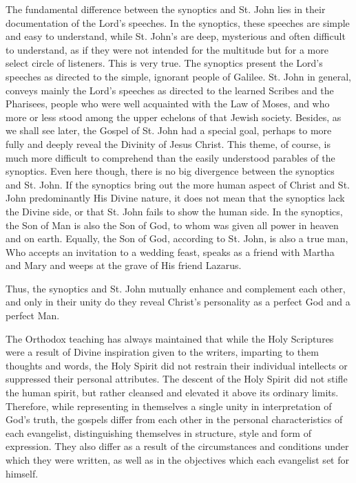 The fundamental difference between the synoptics and St. John lies in their documentation of the Lord's speeches. In the synoptics, these speeches are simple and easy to understand, while St. John's are deep, mysterious and often difficult to understand, as if they were not intended for the multitude but for a more select circle of listeners. This is very true. The synoptics present the Lord's speeches as directed to the simple, ignorant people of Galilee. St. John in general, conveys mainly the Lord's speeches as directed to the learned Scribes and the Pharisees, people who were well acquainted with the Law of Moses, and who more or less stood among the upper echelons of that Jewish society. Besides, as we shall see later, the Gospel of St. John had a special goal, perhaps to more fully and deeply reveal the Divinity of Jesus Christ. This theme, of course, is much more difficult to comprehend than the easily understood parables of the synoptics. Even here though, there is no big divergence between the synoptics and St. John. If the synoptics bring out the more human aspect of Christ and St. John predominantly His Divine nature, it does not mean that the synoptics lack the Divine side, or that St. John fails to show the human side. In the synoptics, the Son of Man is also the Son of God, to whom was given all power in heaven and on earth. Equally, the Son of God, according to St. John, is also a true man, Who accepts an invitation to a wedding feast, speaks as a friend with Martha and Mary and weeps at the grave of His friend Lazarus.

Thus, the synoptics and St. John mutually enhance and complement each other, and only in their unity do they reveal Christ's personality as a perfect God and a perfect Man.

The Orthodox teaching has always maintained that while the Holy Scriptures were a result of Divine inspiration given to the writers, imparting to them thoughts and words, the Holy Spirit did not restrain their individual intellects or suppressed their personal attributes. The descent of the Holy Spirit did not stifle the human spirit, but rather cleansed and elevated it above its ordinary limits. Therefore, while representing in themselves a single unity in interpretation of God's truth, the gospels differ from each other in the personal characteristics of each evangelist, distinguishing themselves in structure, style and form of expression. They also differ as a result of the circumstances and conditions under which they were written, as well as in the objectives which each evangelist set for himself.

